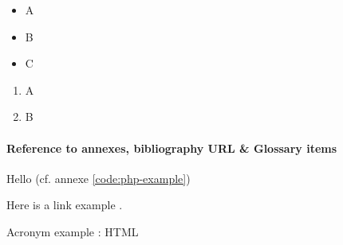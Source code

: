 
\begin{itemize}
	\item A
	\item B
	\item C
\end{itemize}


\begin{enumerate}
	\item A
	\item B
\end{enumerate}

\paragraph*{Reference to annexes, bibliography URL \& Glossary items}

	Hello (cf. annexe \ref{code:php-example})
	
	Here is a link example .
	
	Acronym example : \gls{HTML}

